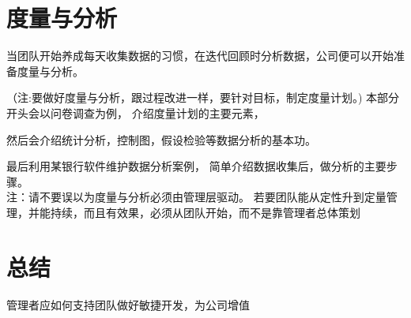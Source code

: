 \documentclass{book}        %
\begin{document}



\part{度量与分析}当团队开始养成每天收集数据的习惯，在迭代回顾时分析数据，公司便可以开始准备度量与分析。


（注:要做好度量与分析，跟过程改进一样，要针对目标，制定度量计划。)
本部分开头会以问卷调查为例，
介绍度量计划的主要元素，

然后会介绍统计分析，控制图，假设检验等数据分析的基本功。

最后利用某银行软件维护数据分析案例，
简单介绍数据收集后，做分析的主要步骤。\\


注：请不要误以为度量与分析必须由管理层驱动。
若要团队能从定性升到定量管理，并能持续，而且有效果，必须从团队开始，而不是靠管理者总体策划
\\



\part{总结} 管理者应如何支持团队做好敏捷开发，为公司增值\\


\end{document}
